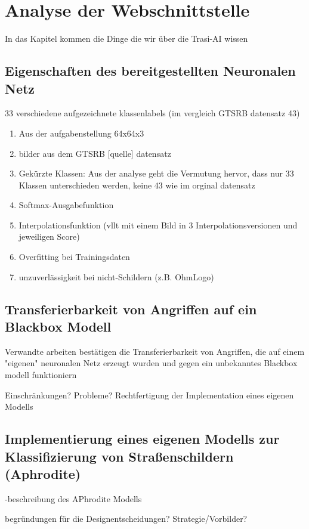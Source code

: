 \chapter{Analyse der Webschnittstelle}
\label{cha:TrasiAnalyse}
In das Kapitel kommen die Dinge die wir über die Trasi-AI wissen
\section{Eigenschaften des bereitgestellten Neuronalen Netz}
\label{sec:TrainingsDaten}




33 verschiedene aufgezeichnete klassenlabels (im vergleich GTSRB datensatz 43)

\begin{enumerate}
	\item 
	Aus der aufgabenstellung 64x64x3
	\item 
	bilder aus dem GTSRB [quelle] datensatz
	\item Gekürzte Klassen: Aus der analyse geht die Vermutung hervor, dass nur 33 Klassen unterschieden werden, keine 43 wie im orginal datensatz
	\item Softmax-Ausgabefunktion 
	\item Interpolationsfunktion (vllt mit einem Bild in 3 Interpolationsversionen und jeweiligen Score) 
	\item Overfitting bei Trainingsdaten
	\item unzuverlässigkeit bei nicht-Schildern (z.B. OhmLogo)
\end{enumerate}

\section{Transferierbarkeit von Angriffen auf ein Blackbox Modell}
\label{sec:TrasiModell}
Verwandte arbeiten bestätigen  die Transferierbarkeit von Angriffen, die auf einem "eigenen" neuronalen Netz erzeugt wurden und gegen ein unbekanntes Blackbox modell funktioniern

Einschränkungen? Probleme? Rechtfertigung der Implementation eines eigenen Modells


\section{Implementierung eines eigenen Modells zur Klassifizierung von Straßenschildern (Aphrodite)}
-beschreibung des APhrodite Modells


begründungen für die Designentscheidungen? Strategie/Vorbilder?

